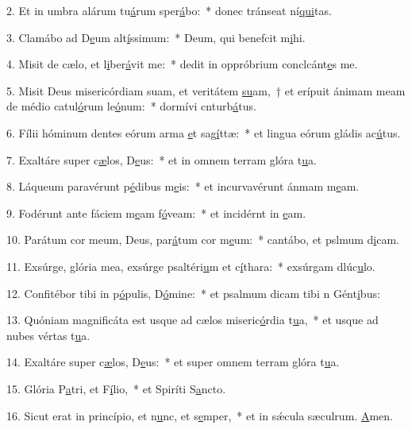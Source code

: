 2. Et in umbra alárum tu\uline{á}rum sper\uline{á}bo:~* donec tránseat ní\uline{qui}tas.\par 
3. Clamábo ad D\uline{e}um alt\uline{í}ssimum:~* Deum, qui benefcit m\uline{i}hi.\par 
4. Misit de cælo, et l\uline{i}ber\uline{á}vit me:~* dedit in oppróbrium conclcánt\uline{e}s me.\par 
5. Misit Deus misericórdiam suam, et veritátem \uline{su}am,~† et erípuit ánimam meam de médio catul\uline{ó}rum le\uline{ó}num:~* dormívi cnturb\uline{á}tus.\par 
6. Fílii hóminum dentes eórum arma \uline{e}t sag\uline{í}ttæ:~* et lingua eórum gládis ac\uline{ú}tus.\par 
7. Exaltáre super c\uline{æ}los, D\uline{e}us:~* et in omnem terram glóra t\uline{u}a.\par 
8. Láqueum paravérunt p\uline{é}dibus m\uline{e}is:~* et incurvavérunt ánmam m\uline{e}am.\par 
9. Fodérunt ante fáciem m\uline{e}am f\uline{ó}veam:~* et incidérnt in \uline{e}am.\par 
10. Parátum cor meum, Deus, par\uline{á}tum cor m\uline{e}um:~* cantábo, et pslmum d\uline{i}cam.\par 
11. Exsúrge, glória mea, exsúrge psaltéri\uline{u}m et c\uline{í}thara:~* exsúrgam dlúc\uline{u}lo.\par 
12. Confitébor tibi in p\uline{ó}pulis, D\uline{ó}mine:~* et psalmum dicam tibi n Gént\uline{i}bus:\par 
13. Quóniam magnificáta est usque ad cælos miseric\uline{ó}rdia t\uline{u}a,~* et usque ad nubes vértas t\uline{u}a.\par 
14. Exaltáre super c\uline{æ}los, D\uline{e}us:~* et super omnem terram glóra t\uline{u}a.\par 
15. Glória P\uline{a}tri, et F\uline{í}lio,~* et Spiríti S\uline{a}ncto.\par 
16. Sicut erat in princípio, et n\uline{u}nc, et s\uline{e}mper,~* et in sǽcula sæculrum. \uline{A}men.\par 
